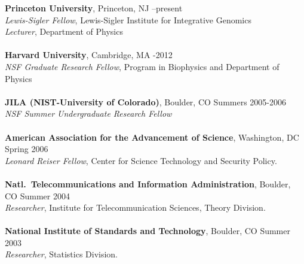 \documentclass[11pt]{article}
\makeatletter
\renewcommand{\section}{\@startsection
{section}%
{1}%
{0mm}%
{2\baselineskip}%
{0.5\baselineskip}%
{\normalfont\bf\MakeUppercase}} %
\makeatother
\begin{document}
{\bf Princeton University}, Princeton, NJ  --present\\
{\it Lewis-Sigler Fellow}, Lewis-Sigler Institute for Integrative Genomics\\ 
{\it Lecturer}, Department of Physics\\
\\
{\bf Harvard University}, 
Cambridge, MA  -2012\\
{\it NSF Graduate Research Fellow}, Program in Biophysics and Department of Physics\\
\\
{\bf JILA (NIST-University of Colorado)}, Boulder, CO   \dotfill Summers 2005-2006\\
{\it NSF Summer Undergraduate Research Fellow}\\
\\
{\bf American Association for the Advancement of Science}, Washington, DC  \dotfill Spring 2006\\
{\it Leonard Reiser Fellow}, Center for Science Technology and Security Policy.\\
\\
{\bf Natl.~Telecommunications and Information Administration}, Boulder, CO  \dotfill Summer 2004\\
{\it Researcher}, Institute for Telecommunication Sciences, Theory Division.\\
\\
{\bf National Institute of Standards and Technology}, Boulder, CO  \dotfill Summer 2003\\
{\it Researcher}, Statistics Division.\\
\end{document}
